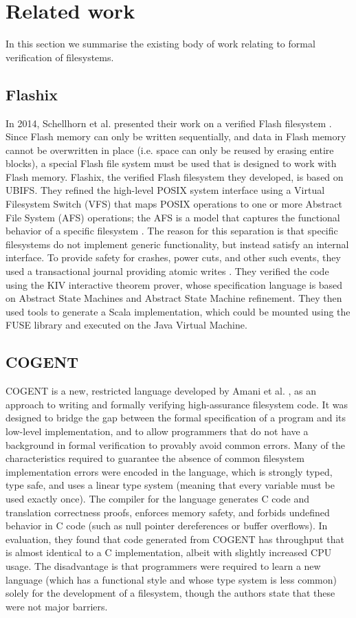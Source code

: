 \section{Related work}
In this section we summarise the existing body of work relating to formal verification of filesystems.

\subsection{Flashix}
In 2014, Schellhorn et al. presented their work on a verified Flash filesystem \cite{schellhorn2014}.
Since Flash memory can only be written sequentially, and data in Flash memory cannot be overwritten in place (i.e. space can only be reused by erasing entire blocks), a special Flash file system must be used that is designed to work with Flash memory.
Flashix, the verified Flash filesystem they developed, is based on UBIFS.
They refined the high-level POSIX system interface using a Virtual Filesystem Switch (VFS) that maps POSIX operations to one or more Abstract File System (AFS) operations; the AFS is a model that captures the functional behavior of a specific filesystem \cite{ernst2012}.
The reason for this separation is that specific filesystems do not implement generic functionality, but instead satisfy an internal interface.
To provide safety for crashes, power cuts, and other such events, they used a transactional journal providing atomic writes \cite{ernst2015}.
They verified the code using the KIV interactive theorem prover, whose specification language is based on Abstract State Machines and Abstract State Machine refinement.
They then used tools to generate a Scala implementation, which could be mounted using the FUSE library and executed on the Java Virtual Machine.

\subsection{COGENT}
COGENT is a new, restricted language developed by Amani et al. \cite{amani2016}, as an approach to writing and formally verifying high-assurance filesystem code.
It was designed to bridge the gap between the formal specification of a program and its low-level implementation, and to allow programmers that do not have a background in formal verification to provably avoid common errors.
Many of the characteristics required to guarantee the absence of common filesystem implementation errors were encoded in the language, which is strongly typed, type safe, and uses a linear type system (meaning that every variable must be used exactly once).
The compiler for the language generates C code and translation correctness proofs, enforces memory safety, and forbids undefined behavior in C code (such as null pointer dereferences or buffer overflows).
In evaluation, they found that code generated from COGENT has throughput that is almost identical to a C implementation, albeit with slightly increased CPU usage.
The disadvantage is that programmers were required to learn a new language (which has a functional style and whose type system is less common) solely for the development of a filesystem, though the authors state that these were not major barriers.

